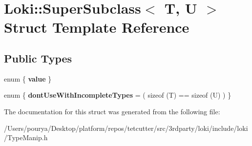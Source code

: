 \hypertarget{structLoki_1_1SuperSubclass}{}\section{Loki\+:\+:Super\+Subclass$<$ T, U $>$ Struct Template Reference}
\label{structLoki_1_1SuperSubclass}
\subsection*{Public Types}
\begin{DoxyCompactItemize}
\item 
\hypertarget{structLoki_1_1SuperSubclass_a9e22669f90aa2c1953fe489c358f8ed8}{}enum \{ {\bfseries value}
 \}\label{structLoki_1_1SuperSubclass_a9e22669f90aa2c1953fe489c358f8ed8}

\item 
\hypertarget{structLoki_1_1SuperSubclass_a1be515eb9851d0832c6a11e8aef8c1da}{}enum \{ {\bfseries dont\+Use\+With\+Incomplete\+Types} = ( sizeof (T) == sizeof (U) )
 \}\label{structLoki_1_1SuperSubclass_a1be515eb9851d0832c6a11e8aef8c1da}

\end{DoxyCompactItemize}


The documentation for this struct was generated from the following file\+:\begin{DoxyCompactItemize}
\item 
/\+Users/pourya/\+Desktop/platform/repos/tetcutter/src/3rdparty/loki/include/loki/Type\+Manip.\+h\end{DoxyCompactItemize}
